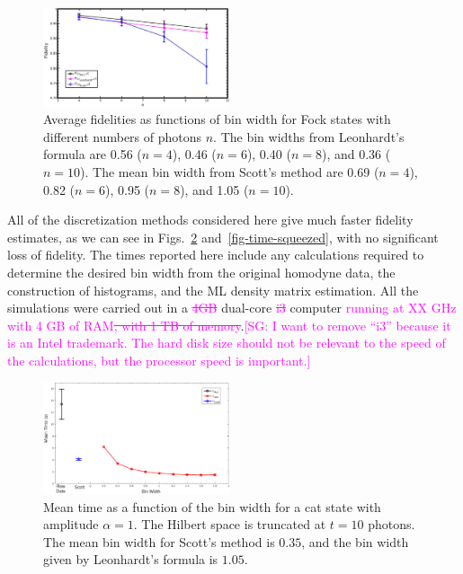\documentclass[
reprint,
superscriptaddress,
showpacs,
amsmath,
amssymb,
aps,
pra,
longbibliography
]{revtex4-1}
\providecommand{\aucmnt}[1]{#1}
\providecommand{\editcolor}[2]{\textcolor{#1}{#2}}
\providecommand{\aucmnt}[1]{}
\providecommand{\editcolor}[2]{#2}
\newcommand{\SG}[1]{\editcolor{magenta}{#1}}
\newcommand{\SGs}[1]{\aucmnt{\editcolor{magenta}{\sout{#1}}}}
\newcommand{\SGc}[1]{\aucmnt{\editcolor{magenta}{[SG: #1]}}}
\begin{document}
\begin{figure}
  \includegraphics[width=0.49\textwidth]{fock.eps}
  \caption{Average fidelities as functions of bin width for Fock
    states with different numbers of photons $n$. The bin widths from
    Leonhardt's formula are 0.56 ($n=4$), 0.46 ($n=6$), 0.40 ($n=8$),
    and 0.36 ($n=10$). The mean bin width from Scott's method are 0.69
    ($n=4$), 0.82 ($n=6$), 0.95 ($n=8$), and 1.05 ($n=10$).}
  \label{fig-fock}
\end{figure}

All of the discretization methods considered here give much faster
fidelity estimates, as we can see in Figs.~\ref{fig-time-catstate}
and~\ref{fig-time-squeezed}, with no significant loss of fidelity. The
times reported here include any calculations required to determine the
desired bin width from the original homodyne data, the construction of
histograms, and the ML density matrix estimation. All the simulations
were carried out in a \SGs{4GB} dual-core \SGs{i3} computer
\SG{running at XX GHz with 4 GB of RAM}\SGs{, with 1 TB of
  memory}.\SGc{I want to remove ``i3'' because it is an Intel
  trademark.  The hard disk size should not be relevant to the speed
  of the calculations, but the processor speed is important.}

\begin{figure}
  \includegraphics[width=0.49\textwidth]{time-estadogato_alpha_1.eps}
  \caption{Mean time as a function of the bin width for a cat state
    with amplitude $\alpha = 1$. The Hilbert space is truncated at $t=10$
    photons. The mean bin width for Scott's method is $0.35$, and the
    bin width given by Leonhardt's formula is $1.05$.}
  \label{fig-time-catstate}
\end{figure}
\end{document}

